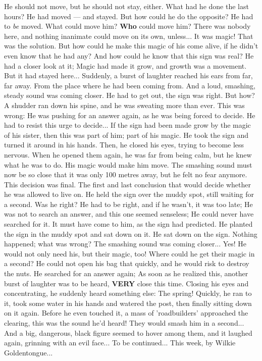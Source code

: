 He should not move, but he should not stay, either. 
What had he done the last hours? He had moved --- and stayed. But how could he do the opposite? 
He had to \emph{be} moved. What could move him? \textbf{Who} could move him? There was nobody here, and nothing inanimate could move on its own, unless... 
It was magic! That was the solution. But how could he make this magic of his come alive, if he didn't even know that he had any? 
And how could he know that this sign was real? 
He had a closer look at it; Magic had made it grow, and growth was a movement. But it had stayed here... 
Suddenly, a burst of laughter reached his ears from far, far away. 
From the place where he had been coming from. 
And a loud, smashing, steady sound was coming closer. He had to get out, the sign was right. But how? 
A shudder ran down his spine, and he was sweating more than ever. This was wrong: He was pushing for an answer again, as he was being forced to decide. He had to resist this urge to decide... 
If the sign had been made grow by the magic of his sister, then this was part of him; part of his magic. He took the sign and turned it around in his hands. Then, he closed his eyes, trying to become less nervous. When he opened them again, he was far from being calm, but he knew what he was to do. 
His magic would make him move. 
The smashing sound must now be so close that it was only 100 metres away, but he felt no fear anymore. This decision was final. 
The first and last conclusion that would decide whether he was allowed to live on. 
He held the sign over the muddy spot, still waiting for a second. Was he right? He had to be right, and if he wasn't, it was too late; He was not to search an answer, and this one seemed senseless; He could never have searched for it. 
It must have come to him, as the sign had predicted. 
He planted the sign in the muddy spot and sat down on it. He sat down on the sign. Nothing happened; what was wrong? 
The smashing sound was coming closer... 
Yes! He would not only need his, but their magic, too! 
Where could he get their magic in a second? He could not open his bag that quickly, and he would risk to destroy the nuts. He searched for an answer again; As soon as he realized this, another burst of laughter was to be heard, \textbf{VERY} close this time. 
Closing his eyes and concentrating, he suddenly heard something else: The spring! Quickly, he ran to it, took some water in his hands and watered the post, then finally sitting down on it again. 
Before he even touched it, a mass of 'roadbuilders' approached the clearing, this was the sound he'd heard! They would smash him in a second... 
And a big, dangerous, black figure seemed to hover among them, and it laughed again, grinning with an evil face... 
To be continued...
This week, by Wilkie Goldentongue...

